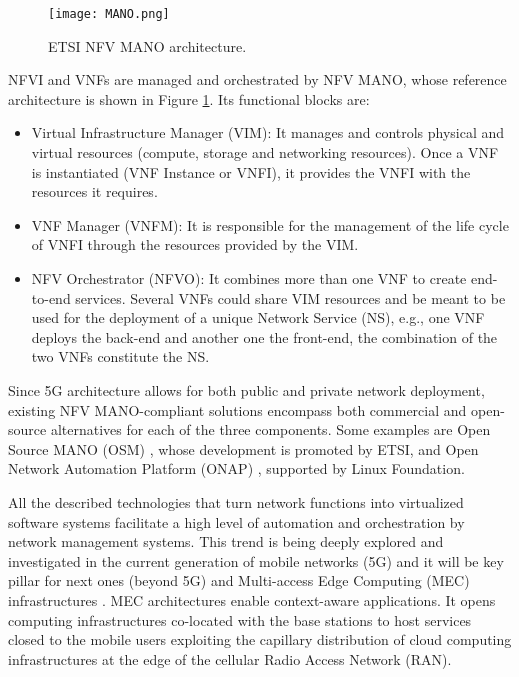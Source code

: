 \begin{figure}[htp]
	\centering
	\texttt{[image: MANO.png]}
	\caption{ETSI NFV MANO architecture.}
	\label{fig:IEEECOMSTmano}
	\vspace{-0.5cm}
\end{figure}

NFVI and VNFs are managed and orchestrated by NFV MANO, whose reference architecture is shown in Figure \ref{fig:IEEECOMSTmano}. Its functional blocks are:

\begin{itemize}
	\item Virtual Infrastructure Manager (VIM): It manages and controls physical and virtual resources (compute, storage and networking resources). Once a VNF is instantiated (VNF Instance or VNFI), it provides the VNFI with the resources it requires.
	\item VNF Manager (VNFM): It is responsible for the management of the life cycle of VNFI through the resources provided by the VIM.
	\item NFV Orchestrator (NFVO): It combines more than one VNF to create end-to-end services. Several VNFs could share VIM resources and be meant to be used for the deployment of a unique Network Service (NS), e.g., one VNF deploys the back-end and another one the front-end, the combination of the two VNFs constitute the NS.
\end{itemize}

Since 5G architecture allows for both public and private network deployment, existing NFV MANO-compliant solutions encompass both commercial and open-source alternatives for each of the three components. Some examples are Open Source MANO (OSM) \cite{OSM}, whose development is promoted by ETSI, and Open Network Automation Platform (ONAP) \cite{ONAP}, supported by Linux Foundation.

All the described technologies that turn network functions into virtualized software systems facilitate a high level of automation and orchestration by network management systems.
This trend is being deeply explored and investigated in the current generation of mobile networks (5G) and it will be key pillar for next ones (beyond 5G) and Multi-access Edge Computing (MEC) infrastructures \cite{etsi2019}. MEC architectures enable context-aware applications. It opens computing infrastructures co-located with the base stations to host services closed to the mobile users exploiting the capillary distribution of cloud computing infrastructures at the edge of the cellular Radio Access Network (RAN).

